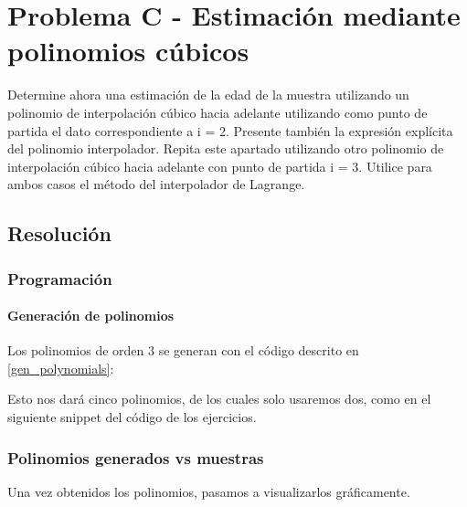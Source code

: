 \section{Problema C - Estimación mediante polinomios cúbicos}

Determine ahora una estimación de la edad de la muestra utilizando un polinomio de interpolación cúbico hacia adelante utilizando como punto de partida el dato correspondiente a i = 2. Presente también la expresión explícita del polinomio interpolador. Repita este apartado utilizando otro polinomio de interpolación cúbico hacia adelante con punto de partida i = 3. Utilice para ambos casos el método del interpolador de Lagrange.

\subsection{Resolución}

\subsubsection{Programación}

\paragraph{Generación de polinomios} Los polinomios de orden 3 se generan con el código descrito en \ref{gen_polynomials}:



Esto nos dará cinco polinomios, de los cuales solo usaremos dos, como en el siguiente snippet del código de los ejercicios.



\newpage 

\subsubsection{Polinomios generados vs muestras}

Una vez obtenidos los polinomios, pasamos a visualizarlos gráficamente.

